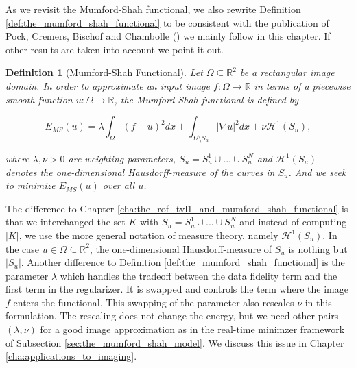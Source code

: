 \documentclass[abstracton]{scrreprt}
\newtheorem{definition}[theorem]{Definition}
\begin{document}
    As we revisit the Mumford-Shah functional, we also rewrite Definition \ref{def:the_mumford_shah_functional} to be consistent with the publication of Pock, Cremers, Bischof and Chambolle (\cite{Pock-et-al-iccv09}) we mainly follow in this chapter. If other results are taken into account we point it out.
    \begin{definition}[Mumford-Shah Functional] %
    \label{def:the_mumford_shah_functional_revisited}
        Let $\Omega \subseteq \mathbb{R}^{2}$ be a rectangular image domain. In order to approximate an input image $f: \Omega \longrightarrow \mathbb{R}$ in terms of a piecewise smooth function $u: \Omega \longrightarrow \mathbb{R}$, the Mumford-Shah functional is defined by
            
            \begin{equation}
                E_{MS}(u) = \lambda \int_{\Omega} (f - u)^{2} dx + \int_{\Omega \setminus S_{u}} |\nabla u|^{2} dx + \nu \mathcal{H}^{1}(S_{u}),
            \label{eq:the_mumford_shah_functional_revisited}
            \end{equation}
        
        where $\lambda, \nu > 0$ are weighting parameters, $S_{u} = S^{1}_{u} \cup ... \cup S^{N}_{u}$ and $\mathcal{H}^{1}(S_{u})$ denotes the one-dimensional Hausdorff-measure of the curves in $S_{u}$. And we seek to minimize $E_{MS}(u)$ over all $u$.
    \end{definition}
    The difference to Chapter \ref{cha:the_rof_tvl1_and_mumford_shah_functional} is that we interchanged the set $K$ with $S_{u} = S^{1}_{u} \cup ... \cup S^{N}_{u}$ and instead of computing $|K|$, we use the more general notation of measure theory, namely $\mathcal{H}^{1}(S_{u})$. In the case $u \in \Omega \subseteq \mathbb{R}^{2}$, the one-dimensional Hausdorff-measure of $S_{u}$ is nothing but $|S_{u}|$. Another difference to Definition \ref{def:the_mumford_shah_functional} is the parameter $\lambda$ which handles the tradeoff between the data fidelity term and the first term in the regularizer. It is swapped and controls the term where the image $f$ enters the functional. This swapping of the parameter also rescales $\nu$ in this formulation. The rescaling does not change the energy, but we need other pairs $(\lambda, \nu)$ for a good image approximation as in the real-time minimzer framework of Subsection \ref{sec:the_mumford_shah_model}. We discuss this issue in Chapter \ref{cha:applications_to_imaging}.\\
\end{document}
